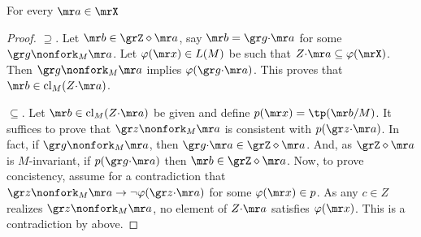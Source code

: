 

  


\begin{fact}
  For every ${\mr a}\in\mrX$\smallskip

\end{fact}

\begin{proof}
  $\supseteq$. 
  Let ${\mr b}\in\grZ\diamond {\mr a}$, say ${\mr b}={\gr g}{\cdot}{\mr a}$ for some ${\gr g}\nonfork_M {\mr a}$.
  Let $\varphi({\mr x})\in L(M)$ be such that $Z{\cdot}{\mr a}\subseteq\varphi(\mrX)$.
  Then ${\gr g}\nonfork_M {\mr a}$ implies $\varphi({\gr g}{\cdot}{\mr a})$.
  This proves that ${\mr b}\in{\rm cl}_M(Z{\cdot}{\mr a})$.
  
  $\subseteq$. 
  Let ${\mr b}\in{\rm cl}_M(Z{\cdot}{\mr a})$ be given and define $p({\mr x})=\tp({\mr b}/M)$.
  It suffices to prove that ${\gr z}\nonfork_M{\mr a}$ is consistent with $p({\gr z}{\cdot}{\mr a})$.
  In fact, if ${\gr g}\nonfork_M{\mr a}$, then ${\gr g}{\cdot}{\mr a}\in\grZ\diamond {\mr a}$.
  And, as $\grZ\diamond {\mr a}$ is $M$-invariant, if $p({\gr g}{\cdot}{\mr a})$ then ${\mr b}\in\grZ\diamond{\mr a}$.
  Now, to prove concistency, assume for a contradiction that ${\gr z}\nonfork_M {\mr a}\rightarrow\neg\varphi({\gr z}{\cdot}{\mr a})$ for some $\varphi({\mr x})\in p$.
  As any $c\in Z$ realizes ${\gr z}\nonfork_M {\mr a}$, no element of $Z{\cdot}{\mr a}$ satisfies $\varphi({\mr x})$.
  This is a contradiction by  above.
\end{proof}

